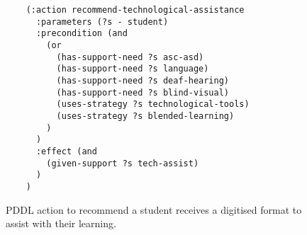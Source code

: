 \begin{figure}[t]
    \begin{lstlisting}
    (:action recommend-technological-assistance
      :parameters (?s - student)
      :precondition (and 
        (or
          (has-support-need ?s asc-asd)
          (has-support-need ?s language)
          (has-support-need ?s deaf-hearing)
          (has-support-need ?s blind-visual)
          (uses-strategy ?s technological-tools)
          (uses-strategy ?s blended-learning)
        )
      )
      :effect (and 
        (given-support ?s tech-assist)
      )
    )
    \end{lstlisting}
    \caption{PDDL action to recommend a student receives a digitised format to assist with their learning.}\label{fig:tech-assist}
\end{figure}